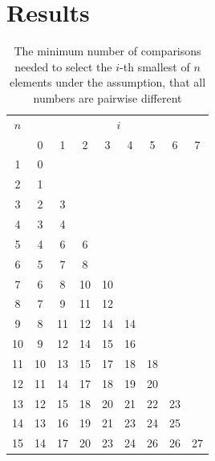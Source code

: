 \documentclass[10pt,journal,compsoc]{IEEEtran}
\begin{document}
\section{Results}

\begin{table}[!t]
  \renewcommand{\arraystretch}{1.2}
  \caption{The minimum number of comparisons needed to select the $i$-th smallest of $n$ elements under the assumption, that all numbers are pairwise different}
  \label{table:num-comparisons}
  \centering
  \begin{tabular}{c|cccccccc}
    $n$ & \multicolumn{8}{c}{$i$}                                    \\
        & 0                       & 1  & 2  & 3  & 4  & 5  & 6  & 7  \\ \hline
    1   & 0                                                          \\
    2   & 1                                                          \\
    3   & 2                       & 3                                \\
    4   & 3                       & 4                                \\
    5   & 4                       & 6  & 6                           \\
    6   & 5                       & 7  & 8                           \\
    7   & 6                       & 8  & 10 & 10                     \\
    8   & 7                       & 9  & 11 & 12                     \\
    9   & 8                       & 11 & 12 & 14 & 14                \\
    10  & 9                       & 12 & 14 & 15 & 16                \\
    11  & 10                      & 13 & 15 & 17 & 18 & 18           \\
    12  & 11                      & 14 & 17 & 18 & 19 & 20           \\
    13  & 12                      & 15 & 18 & 20 & 21 & 22 & 23      \\
    14  & 13                      & 16 & 19 & 21 & 23 & 24 & 25      \\
    15  & 14                      & 17 & 20 & 23 & 24 & 26 & 26 & 27 \\
  \end{tabular}
\end{table}
\end{document}
